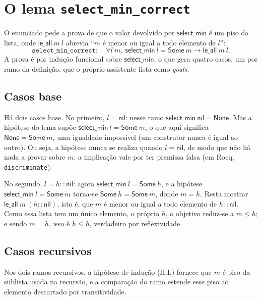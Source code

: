 \documentclass[11pt,a4paper]{article}
\newcommand{\nil}{\mathsf{nil}}
\newcommand{\cons}{::}
\newcommand{\selmin}{\mathsf{select\_min}}
\newcommand{\leall}{\mathsf{le\_all}}
\begin{document}
\section{O lema \texttt{select\_min\_correct}}

O enunciado pede a prova de que o valor devolvido por $\selmin$ \'e um piso da
lista, onde $\leall\ m\ l$ abrevia ``$m$ \'e menor ou igual a todo elemento de $l$'':
\[
  \texttt{select\_min\_correct}:\quad \forall l\ m,\ \selmin\ l = \mathsf{Some}\ m \to \leall\ m\ l.
\]
A prova \'e por indu\c{c}\~ao funcional sobre $\selmin$, o que gera quatro casos,
um por ramo da defini\c{c}\~ao, que o pr\'oprio assistente lista como \emph{goals}.

\subsection{Casos base}

H\'a dois casos base. No primeiro, $l = \nil$: nesse ramo $\selmin\ \nil = \mathsf{None}$.
Mas a hip\'otese do lema sup\~oe $\selmin\ l = \mathsf{Some}\ m$, o que aqui significa
$\mathsf{None} = \mathsf{Some}\ m$, uma igualdade imposs\'ivel (um construtor nunca
\'e igual ao outro). Ou seja, a hip\'otese nunca se realiza quando $l = \nil$, de
modo que n\~ao h\'a nada a provar sobre $m$: a implica\c{c}\~ao vale por ter
premissa falsa (em Rocq, \texttt{discriminate}).

No segundo, $l = h\cons\nil$: agora $\selmin\ l = \mathsf{Some}\ h$, e a
hip\'otese $\selmin\ l = \mathsf{Some}\ m$ torna-se $\mathsf{Some}\ h = \mathsf{Some}\ m$,
donde $m = h$. Resta mostrar $\leall\ m\ (h\cons\nil)$, isto \'e, que $m$ \'e menor
ou igual a todo elemento de $h\cons\nil$. Como essa lista tem um \'unico elemento,
o pr\'oprio $h$, o objetivo reduz-se a $m \le h$; e sendo $m = h$, isso \'e
$h \le h$, verdadeiro por reflexividade.

\subsection{Casos recursivos}

Nos dois ramos recursivos, a hip\'otese de indu\c{c}\~ao (H.I.) fornece que $m$
\'e piso da sublista usada na recurs\~ao, e a compara\c{c}\~ao do ramo estende
esse piso ao elemento descartado por transitividade.
\end{document}
